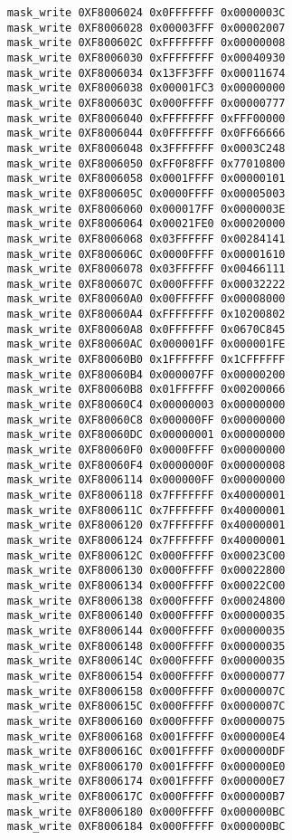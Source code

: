 \begin{lstlisting}
    mask_write 0XF8006024 0x0FFFFFFF 0x0000003C
    mask_write 0XF8006028 0x00003FFF 0x00002007
    mask_write 0XF800602C 0xFFFFFFFF 0x00000008
    mask_write 0XF8006030 0xFFFFFFFF 0x00040930
    mask_write 0XF8006034 0x13FF3FFF 0x00011674
    mask_write 0XF8006038 0x00001FC3 0x00000000
    mask_write 0XF800603C 0x000FFFFF 0x00000777
    mask_write 0XF8006040 0xFFFFFFFF 0xFFF00000
    mask_write 0XF8006044 0x0FFFFFFF 0x0FF66666
    mask_write 0XF8006048 0x3FFFFFFF 0x0003C248
    mask_write 0XF8006050 0xFF0F8FFF 0x77010800
    mask_write 0XF8006058 0x0001FFFF 0x00000101
    mask_write 0XF800605C 0x0000FFFF 0x00005003
    mask_write 0XF8006060 0x000017FF 0x0000003E
    mask_write 0XF8006064 0x00021FE0 0x00020000
    mask_write 0XF8006068 0x03FFFFFF 0x00284141
    mask_write 0XF800606C 0x0000FFFF 0x00001610
    mask_write 0XF8006078 0x03FFFFFF 0x00466111
    mask_write 0XF800607C 0x000FFFFF 0x00032222
    mask_write 0XF80060A0 0x00FFFFFF 0x00008000
    mask_write 0XF80060A4 0xFFFFFFFF 0x10200802
    mask_write 0XF80060A8 0x0FFFFFFF 0x0670C845
    mask_write 0XF80060AC 0x000001FF 0x000001FE
    mask_write 0XF80060B0 0x1FFFFFFF 0x1CFFFFFF
    mask_write 0XF80060B4 0x000007FF 0x00000200
    mask_write 0XF80060B8 0x01FFFFFF 0x00200066
    mask_write 0XF80060C4 0x00000003 0x00000000
    mask_write 0XF80060C8 0x000000FF 0x00000000
    mask_write 0XF80060DC 0x00000001 0x00000000
    mask_write 0XF80060F0 0x0000FFFF 0x00000000
    mask_write 0XF80060F4 0x0000000F 0x00000008
    mask_write 0XF8006114 0x000000FF 0x00000000
    mask_write 0XF8006118 0x7FFFFFFF 0x40000001
    mask_write 0XF800611C 0x7FFFFFFF 0x40000001
    mask_write 0XF8006120 0x7FFFFFFF 0x40000001
    mask_write 0XF8006124 0x7FFFFFFF 0x40000001
    mask_write 0XF800612C 0x000FFFFF 0x00023C00
    mask_write 0XF8006130 0x000FFFFF 0x00022800
    mask_write 0XF8006134 0x000FFFFF 0x00022C00
    mask_write 0XF8006138 0x000FFFFF 0x00024800
    mask_write 0XF8006140 0x000FFFFF 0x00000035
    mask_write 0XF8006144 0x000FFFFF 0x00000035
    mask_write 0XF8006148 0x000FFFFF 0x00000035
    mask_write 0XF800614C 0x000FFFFF 0x00000035
    mask_write 0XF8006154 0x000FFFFF 0x00000077
    mask_write 0XF8006158 0x000FFFFF 0x0000007C
    mask_write 0XF800615C 0x000FFFFF 0x0000007C
    mask_write 0XF8006160 0x000FFFFF 0x00000075
    mask_write 0XF8006168 0x001FFFFF 0x000000E4
    mask_write 0XF800616C 0x001FFFFF 0x000000DF
    mask_write 0XF8006170 0x001FFFFF 0x000000E0
    mask_write 0XF8006174 0x001FFFFF 0x000000E7
    mask_write 0XF800617C 0x000FFFFF 0x000000B7
    mask_write 0XF8006180 0x000FFFFF 0x000000BC
    mask_write 0XF8006184 0x000FFFFF 0x000000BC

\end{lstlisting}
